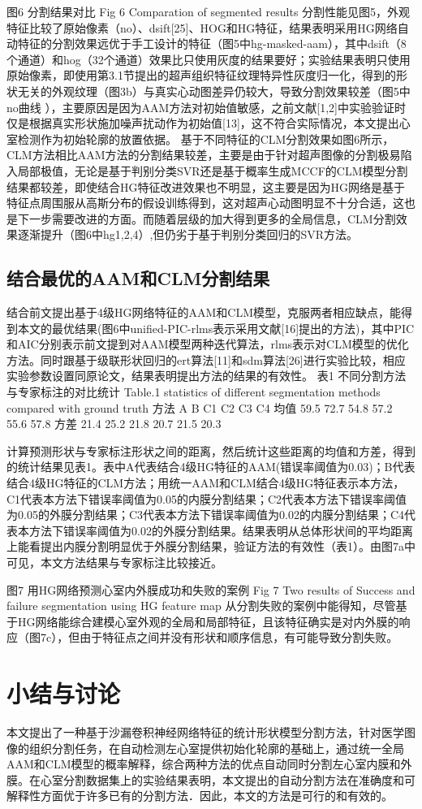图6 分割结果对比
Fig 6 Comparation of segmented results
分割性能见图5，外观特征比较了原始像素（no）、dsift[25]、HOG和HG特征，结果表明采用HG网络自动特征的分割效果远优于手工设计的特征（图5中hg-masked-aam），其中dsift（8个通道）和hog（32个通道）效果比只使用灰度的结果要好；实验结果表明只使用原始像素，即使用第3.1节提出的超声组织特征纹理特异性灰度归一化，得到的形状无关的外观纹理（图3b）与真实心动图差异仍较大，导致分割效果较差（图5中no曲线 ），主要原因是因为AAM方法对初始值敏感，之前文献[1,2]中实验验证时仅是根据真实形状施加噪声扰动作为初始值[13]，这不符合实际情况，本文提出心室检测作为初始轮廓的放置依据。
基于不同特征的CLM分割效果如图6所示，CLM方法相比AAM方法的分割结果较差，主要是由于针对超声图像的分割极易陷入局部极值，无论是基于判别分类SVR还是基于概率生成MCCF的CLM模型分割结果都较差，即使结合HG特征改进效果也不明显，这主要是因为HG网络是基于特征点周围服从高斯分布的假设训练得到，这对超声心动图明显不十分合适，这也是下一步需要改进的方面。而随着层级的加大得到更多的全局信息，CLM分割效果逐渐提升（图6中hg1,2,4）,但仍劣于基于判别分类回归的SVR方法。
\subsection{结合最优的AAM和CLM分割结果}
结合前文提出基于4级HG网络特征的AAM和CLM模型，克服两者相应缺点，能得到本文的最优结果(图6中unified-PIC-rlms表示采用文献[16]提出的方法)，其中PIC和AIC分别表示前文提到对AAM模型两种迭代算法，rlms表示对CLM模型的优化方法。同时跟基于级联形状回归的ert算法[11]和sdm算法[26]进行实验比较，相应实验参数设置同原论文，结果表明提出方法的结果的有效性。
表1 不同分割方法与专家标注的对比统计
Table.1 statistics of different segmentation methods compared with ground truth
方法	A	B	C1	C2	C3	C4
均值	59.5	72.7	54.8	57.2	55.6	57.8
方差	21.4	25.2	21.8	20.7	21.5	20.3

计算预测形状与专家标注形状之间的距离，然后统计这些距离的均值和方差，得到的统计结果见表1。表中A代表结合4级HG特征的AAM(错误率阈值为0.03)；B代表结合4级HG特征的CLM方法；用统一AAM和CLM结合4级HG特征表示本方法，C1代表本方法下错误率阈值为0.05的内膜分割结果；C2代表本方法下错误率阈值为0.05的外膜分割结果；C3代表本方法下错误率阈值为0.02的内膜分割结果；C4代表本方法下错误率阈值为0.02的外膜分割结果。结果表明从总体形状间的平均距离上能看提出内膜分割明显优于外膜分割结果，验证方法的有效性（表1）。由图7a中可见，本文方法结果与专家标注比较接近。
 
图7 用HG网络预测心室内外膜成功和失败的案例
Fig 7 Two results of Success and failure segmentation using HG feature map
从分割失败的案例中能得知，尽管基于HG网络能综合建模心室外观的全局和局部特征，且该特征确实是对内外膜的响应（图7c），但由于特征点之间并没有形状和顺序信息，有可能导致分割失败。

\section{小结与讨论}

本文提出了一种基于沙漏卷积神经网络特征的统计形状模型分割方法，针对医学图像的组织分割任务，在自动检测左心室提供初始化轮廓的基础上，通过统一全局AAM和CLM模型的概率解释，综合两种方法的优点自动同时分割左心室内膜和外膜。在心室分割数据集上的实验结果表明，本文提出的自动分割方法在准确度和可解释性方面优于许多已有的分割方法．因此，本文的方法是可行的和有效的。

